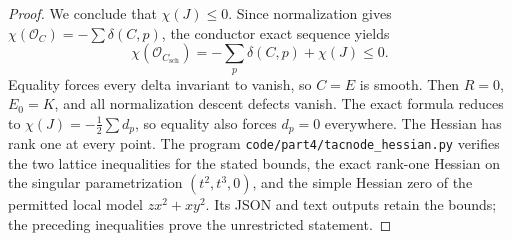\begin{proof}
We conclude that $\chi(J)\leq0$. Since normalization gives
$\chi(\mathcal O_C)=-\sum\delta(C,p)$, the conductor exact
sequence yields
\[
 \chi(\mathcal O_{C_{\mathrm{sch}}})
 =-\sum_p\delta(C,p)+\chi(J)\leq0.
\]
Equality forces every delta invariant to vanish, so $C=E$ is
smooth. Then $R=0$, $E_0=K$, and all normalization descent
defects vanish. The exact formula reduces to
$\chi(J)=-\tfrac12\sum d_p$, so equality also forces
$d_p=0$ everywhere. The Hessian has rank one at every point.
The program \texttt{code/part4/tacnode\_hessian.py} verifies the
two lattice inequalities for the stated bounds, the exact
rank-one Hessian on the singular parametrization
$(t^2,t^3,0)$, and the simple Hessian zero of the permitted
local model $zx^2+xy^2$. Its JSON and text outputs retain
the bounds; the preceding inequalities prove the unrestricted
statement.
\end{proof}

